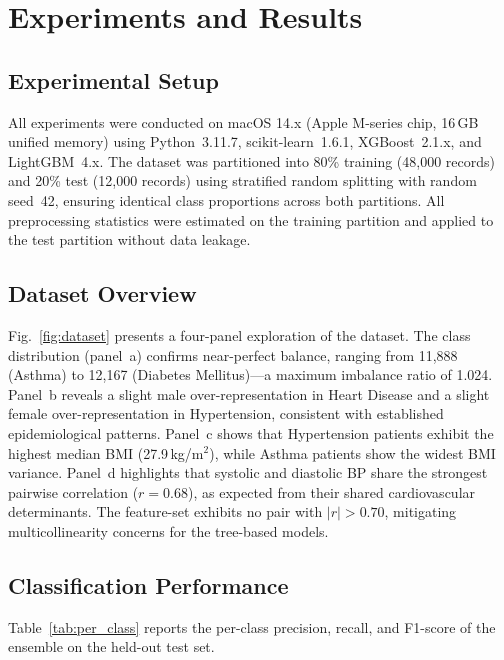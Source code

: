 \documentclass[journal]{IEEEtran}
\begin{document}
\section{Experiments and Results}
\label{sec:exp}

\subsection{Experimental Setup}

All experiments were conducted on macOS 14.x (Apple M-series chip, 16\,GB
unified memory) using Python~3.11.7, scikit-learn~1.6.1, XGBoost~2.1.x,
and LightGBM~4.x. The dataset was partitioned into 80\% training
(48,000 records) and 20\% test (12,000 records) using stratified random
splitting with random seed~42, ensuring identical class proportions across
both partitions. All preprocessing statistics were estimated on the training
partition and applied to the test partition without data leakage.

\subsection{Dataset Overview}

Fig.~\ref{fig:dataset} presents a four-panel exploration of the dataset.
The class distribution (panel~a) confirms near-perfect balance, ranging
from 11,888 (Asthma) to 12,167 (Diabetes Mellitus)—a maximum imbalance
ratio of 1.024. Panel~b reveals a slight male over-representation in Heart
Disease and a slight female over-representation in Hypertension, consistent
with established epidemiological patterns. Panel~c shows that Hypertension
patients exhibit the highest median BMI (27.9\,kg/m$^2$), while Asthma
patients show the widest BMI variance. Panel~d highlights that systolic and
diastolic BP share the strongest pairwise correlation ($r = 0.68$), as
expected from their shared cardiovascular determinants. The feature-set
exhibits no pair with $|r| > 0.70$, mitigating multicollinearity concerns
for the tree-based models.

\subsection{Classification Performance}

Table~\ref{tab:per_class} reports the per-class precision, recall, and
F1-score of the ensemble on the held-out test set.
\end{document}
